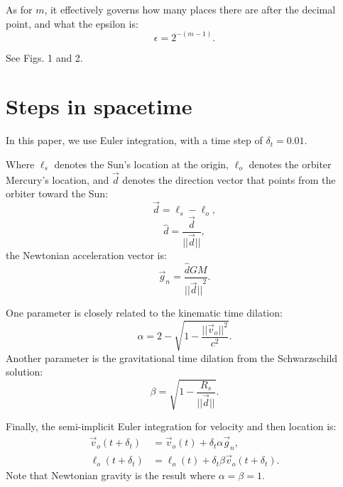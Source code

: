 \documentclass[12pt]{article}
\begin{document}
As for $m$, it effectively governs how many places there are after the decimal point, and what the epsilon is:
\begin{equation}
\epsilon = 2^{-(m - 1)}.
\end{equation}

See Figs. 1 and 2.


\section{Steps in spacetime}

In this paper, we use Euler integration, with a time step of $\delta_{t} = 0.01$.

Where $\ell_s$ denotes the Sun's location at the origin, $\ell_o$ denotes the orbiter Mercury's location, and $\vec{d}$ denotes the direction vector that points from the orbiter toward the Sun:
\begin{equation}
\label{direction_vector}
\vec{d} = \ell_{s} - \ell_{o},	
\end{equation}
\begin{equation}
\label{direction_unit_vector}
\hat{d} = \frac{\vec{d}}{\lvert\lvert \vec{d} \rvert\rvert},
\end{equation}
the Newtonian acceleration vector is:
\begin{equation}
\label{newton}
\vec{g}_n = \frac{\hat{d} G M}{{\lvert\lvert \vec{d} \rvert\rvert}^2}.
\end{equation}

One parameter is closely related to the kinematic time dilation:
\begin{equation}
\label{eq_kinematic}
\alpha = 2 - \sqrt{1 - \frac{\lvert\lvert \vec{v}_{o}\rvert\rvert^2}{c^2}}.
\end{equation}
Another parameter is the gravitational time dilation from the Schwarzschild solution:
\begin{equation}
\label{eq_gravitational}
\beta = \sqrt{1 - \frac{R_{s}}{\lvert \lvert \vec{d} \rvert \rvert}}.
\end{equation}

Finally, the semi-implicit Euler integration for velocity and then location is:
\begin{align}
\label{eq_velocity}
\vec{v}_{o}(t + \delta_t) &= \vec{v}_{o}(t) + \delta_{t} \alpha \vec{g}_n, \\
\label{eq_position}
\ell_{o}(t + \delta_t) &= \ell_{o}(t) + \delta_{t} \beta \vec{v}_{o}(t + \delta_t).
\end{align}
Note that Newtonian gravity is the result where $\alpha = \beta = 1$.
\end{document}
